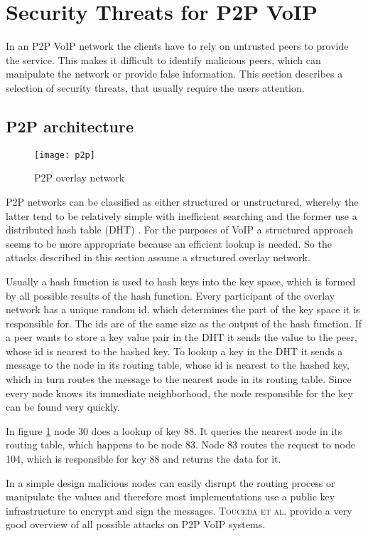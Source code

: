 \documentclass[a4paper,conference]{IEEEtran}
\begin{document}
\section{Security Threats for P2P VoIP}
\label{p2p}
In an P2P VoIP network the clients have to rely on untrusted peers to provide
the service. This makes it difficult to identify malicious peers, which can
manipulate
the network or provide false information. This section describes a selection of
security threats, that usually require the users attention.

\subsection{P2P architecture}
\begin{figure}
\centering
\texttt{[image: p2p]}

\caption{P2P overlay network \cite{touceda}}
\label{fig:p2p}
\end{figure}

P2P networks can be classified as either structured or unstructured, whereby the
latter tend to be relatively simple with inefficient searching and the former
use
a distributed hash table (DHT) \cite{chopra}. For the purposes of VoIP a
structured approach seems to be more appropriate because an
efficient lookup is needed. So the attacks described in this section assume a
structured overlay network.


Usually a hash function is used to hash keys into the key space, which is formed
by all possible results of the hash function. Every participant of the overlay
network has a unique random id, which determines the part of the key space it is
responsible for. The ids are of the same size
as the output of the hash function. If a peer wants to store a key value pair in
the DHT it sends the value to the peer, whose id is nearest to the hashed key.
To lookup a key in the DHT it sends a message to the
node in its routing table, whose id is nearest to the hashed key, which in turn
routes the message to the nearest node in its routing table.
Since every node knows its immediate neighborhood, the node responsible for the
key can be found very quickly.

In figure \ref{fig:p2p} node 30 does a lookup of key 88. It queries the nearest
node in its routing table, which happens to be node 83. Node 83 routes the
request to node 104, which is responsible for key 88 and returns the data for
it.

In a simple design malicious nodes can easily disrupt the routing process or
manipulate the values and therefore most implementations use a
public key infrastructure to encrypt and sign the messages. \textsc{Touceda et
al.} \cite{touceda} provide a very good overview of all possible attacks on P2P
VoIP systems.
\end{document}

